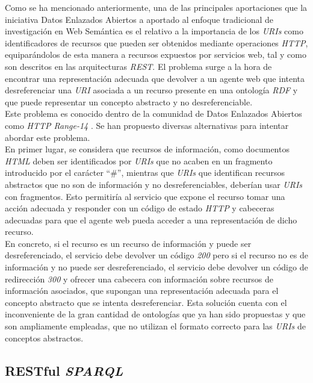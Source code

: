 Como se ha mencionado anteriormente, una de las principales aportaciones que la iniciativa Datos Enlazados Abiertos a aportado al enfoque tradicional de investigaci\'on en Web Sem\'antica es el relativo a la importancia de los \textit{URIs} como identificadores de recursos que pueden ser obtenidos mediante operaciones \textit{HTTP}, equipar\'andolos de esta manera a recursos expuestos por servicios web, tal y como son descritos en las arquitecturas \textit{REST}. El problema surge a la hora de encontrar una representaci\'on adecuada que devolver a un agente web que intenta desreferenciar una \textit{URI} asociada a un recurso presente en una ontolog\'ia \textit{RDF} y que puede representar un concepto abstracto y no desreferenciable.\\
Este problema es conocido dentro de la comunidad de Datos Enlazados Abiertos como \textit{HTTP Range-14} \cite{fielding2005httprange}. Se han propuesto diversas alternativas para intentar abordar este problema.\\
En primer lugar, se considera que recursos de informaci\'on, como documentos \textit{HTML} deben ser identificados por \textit{URIs} que no acaben en un fragmento introducido por el car\'acter ``\#'', mientras que \textit{URIs} que identifican recursos abstractos que no son de informaci\'on y no desreferenciables, deber\'ian usar \textit{URIs} con fragmentos. Esto permitir\'ia al servicio que expone el recurso tomar una acci\'on adecuada y responder con un c\'odigo de estado \textit{HTTP} y cabeceras adecuadas para que el agente web pueda acceder a una representaci\'on de dicho recurso.\\
En concreto, si el recurso es un recurso de informaci\'on y puede ser desreferenciado, el servicio debe devolver un c\'odigo \textit{200} pero si el recurso no es de informaci\'on y no puede ser desreferenciado, el servicio debe devolver un c\'odigo de redirecci\'on \textit{300} y ofrecer una cabecera con informaci\'on sobre recursos de informaci\'on asociados, que supongan una representaci\'on adecuada para el concepto abstracto que se intenta desreferenciar.  Esta soluci\'on cuenta con el inconveniente de la gran cantidad de ontolog\'ias que ya han sido propuestas y que son ampliamente empleadas, que no utilizan el formato correcto para las \textit{URIs} de conceptos abstractos.


\subsection{RESTful \textit{SPARQL}}

